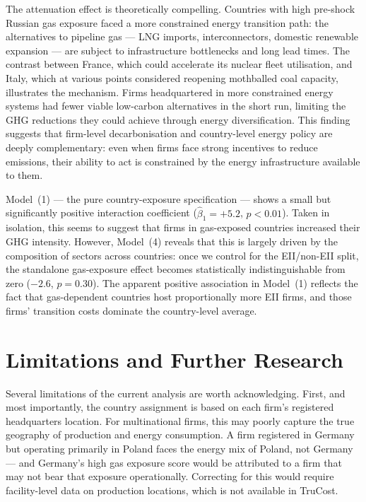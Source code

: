 \documentclass[authoryear,preprint,review,12pt]{elsarticle}
\begin{document}
The attenuation effect is theoretically compelling. Countries with high pre-shock Russian gas exposure faced a more constrained energy transition path: the alternatives to pipeline gas --- LNG imports, interconnectors, domestic renewable expansion --- are subject to infrastructure bottlenecks and long lead times. The contrast between France, which could accelerate its nuclear fleet utilisation, and Italy, which at various points considered reopening mothballed coal capacity, illustrates the mechanism. Firms headquartered in more constrained energy systems had fewer viable low-carbon alternatives in the short run, limiting the GHG reductions they could achieve through energy diversification. This finding suggests that firm-level decarbonisation and country-level energy policy are deeply complementary: even when firms face strong incentives to reduce emissions, their ability to act is constrained by the energy infrastructure available to them.

Model~(1) --- the pure country-exposure specification --- shows a small but significantly positive interaction coefficient ($\hat\beta_1 = +5.2$, $p<0.01$). Taken in isolation, this seems to suggest that firms in gas-exposed countries increased their GHG intensity. However, Model~(4) reveals that this is largely driven by the composition of sectors across countries: once we control for the EII/non-EII split, the standalone gas-exposure effect becomes statistically indistinguishable from zero ($-2.6$, $p=0.30$). The apparent positive association in Model~(1) reflects the fact that gas-dependent countries host proportionally more EII firms, and those firms' transition costs dominate the country-level average.

\section{Limitations and Further Research}
\label{sec:limits}

Several limitations of the current analysis are worth acknowledging. First, and most importantly, the country assignment is based on each firm's registered headquarters location. For multinational firms, this may poorly capture the true geography of production and energy consumption. A firm registered in Germany but operating primarily in Poland faces the energy mix of Poland, not Germany --- and Germany's high gas exposure score would be attributed to a firm that may not bear that exposure operationally. Correcting for this would require facility-level data on production locations, which is not available in TruCost.
\end{document}
